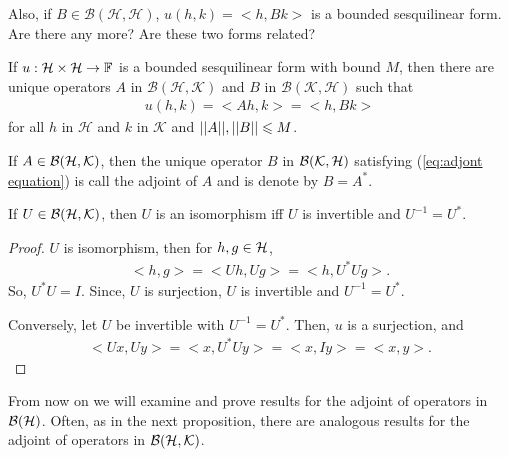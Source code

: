 Also, if $B\in \mathcal{B}(\mathcal{H},\mathcal{H})$, 
$u(h, k) = <h, Bk>$ is a bounded sesquilinear form. 
Are there any more? Are these two forms related?

\begin{theorem}{}{}
    If $u:\mathcal{H}\times\mathcal{H}\rightarrow \mathbb{F}$ is a bounded sesquilinear form with bound $M$, 
    then there are unique operators $A$ in $\mathcal{B}(\mathcal{H},\mathcal{K})$ and $B$ in $\mathcal{B}(\mathcal{K},\mathcal{H})$
    such that 
    \begin{align}
        u(h,k) = <Ah,k>=<h,Bk>
        \label{eq:adjont equation}
    \end{align}
    for all $h$ in $\mathcal{H}$ and $k$ in $\mathcal{K}$ and $||A||,||B||\leqslant M$. 
\end{theorem}

\begin{definition}{}{}
    If $A\in \mathcal{B}(\mathcal{H},\mathcal{K})$, then the unique operator $B$ in $\mathcal{B}(\mathcal{K},\mathcal{H})$ satisfying (\ref{eq:adjont equation})
    is call the adjoint of $A$ and is denote by $B=A^*$.
\end{definition}

\begin{proposition}{}{}
    If $U\in \mathcal{B}(\mathcal{H},\mathcal{K})$, then $U$ is an isomorphism iff $U$ is invertible and $U^{-1}=U^*$.
\end{proposition}

\begin{proof}
    $U$ is isomorphism, then for $h,g\in \mathcal{H}$, 
    \begin{align*}
        <h,g>=<Uh,Ug> = <h,U^*Ug>.
    \end{align*} 
    So, $U^*U=I$. Since, $U$ is surjection, $U$ is invertible and $U^{-1}=U^*$.

    Conversely, let $U$ be invertible with $U^{-1}=U^*$. Then, $u$ is a surjection, and 
    \begin{align*}
        <Ux,Uy> = <x,U^*Uy>=<x,Iy>=<x,y>.
    \end{align*}
\end{proof}

From now on we will examine and prove results for the adjoint of operators 
in $\mathcal{B}(\mathcal{H})$. Often, as in the next proposition, there are analogous results for 
the adjoint of operators in $\mathcal{B}(\mathcal{H},\mathcal{K})$.

